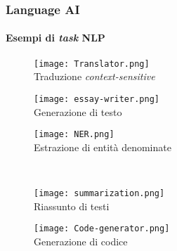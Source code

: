 \begin{frame}[t]
    \frametitle{Language AI}
    \framesubtitle{Esempi di \emph{task} NLP}
    {\scriptsize
        \begin{minipage}[t]{\textwidth}
            \begin{minipage}[t]{.33\textwidth}
                \begin{figure}[hb]
                    \centering
                    \texttt{[image: Translator.png]}\\Traduzione \emph{context-sensitive}
                \end{figure}
            \end{minipage}
            \begin{minipage}[t]{.33\textwidth}
                \begin{figure}[hb]
                    \centering
                    \texttt{[image: essay-writer.png]}\\Generazione di testo
                \end{figure}
            \end{minipage}
            \begin{minipage}[t]{.33\textwidth}
                \begin{figure}[hb]
                    \centering
                    \texttt{[image: NER.png]}\\Estrazione di entità denominate
                \end{figure}
            \end{minipage}
        \end{minipage}
    \\\vspace*{.5cm}
        \begin{minipage}[b]{\textwidth}
            \begin{minipage}[b]{.33\textwidth}
                \begin{figure}[hb]
                    \centering
                    \texttt{[image: summarization.png]}\\Riassunto di testi
                \end{figure}
            \end{minipage}
            \begin{minipage}[b]{.33\textwidth}
                \begin{figure}[hb]
                    \centering
                    \texttt{[image: Code-generator.png]}\\Generazione di codice

\end{figure}
\end{minipage}
\end{minipage}}
\end{frame}
